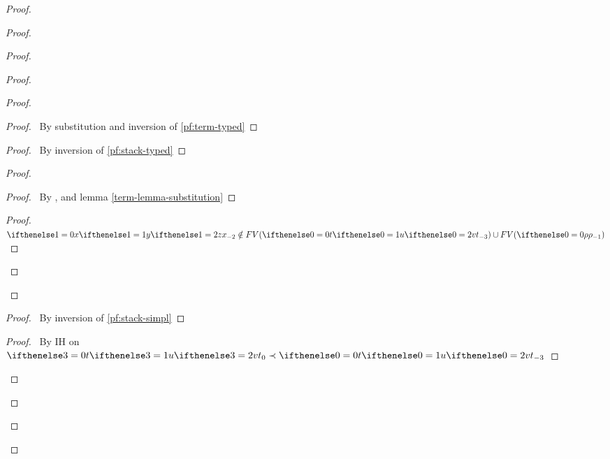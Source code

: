 \documentclass[a4paper]{article}
\begin{document}
\begin{proof}
\begin{proof}
\begin{proof}
\begin{proof}
        \begin{proof}
          \begin{proof}
            \pf\ By substitution and inversion of \ref{pf:term-typed}
          \end{proof}
          \begin{proof}
            \pf\ By inversion of \ref{pf:stack-typed}
          \end{proof}
          \begin{proof}
            \begin{proof}
              \pf\ By ,  and lemma \ref{term-lemma-substitution}
            \end{proof}
            \qedstep
            \begin{proof}
              \pf\ $\aVar[1] \notin FV(\aTerm) \cup FV(\env)$
            \end{proof}
          \end{proof}
        \end{proof}
        \begin{proof}
          \pf\ By inversion of \ref{pf:stack-simpl}
        \end{proof}
        \qedstep
        \begin{proof}
          \pf\ By IH on $\aTerm[3] \prec \aTerm$
        \end{proof}
      \end{proof}

\end{proof}
\end{proof}
\end{proof}
\end{document}
